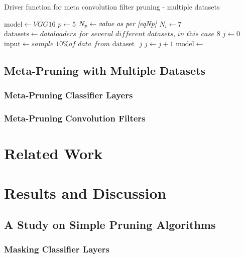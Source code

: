 \documentclass{article}
\begin{document}
\begin{algorithm}[t]
	\caption{Driver function for meta convolution filter pruning - multiple datasets} \label{FilterPruneDriverMeta}
	\begin{algorithmic}[1]	
		\State $\mathrm{model} \gets \textit{VGG16}$
		\State $p \gets 5$
		\State $N_p \gets \textit{value as per \eqref{eqNp}}$
		\State $N_i \gets 7$
		\State $\mathrm{datasets} \gets \textit{dataloaders for several different datasets, in this case $8$}$
		\State $j \gets 0$
				\State $\mathrm{input} \gets \textit{sample 10\% of data from $\mathrm{dataset}$ }j$
				\State $j \gets j + 1$
			\EndIf
			\State $\mathrm{model} \gets $ 
		\EndWhile
	\end{algorithmic}
\end{algorithm}

\subsection{Meta-Pruning with Multiple Datasets}

\subsubsection{Meta-Pruning Classifier Layers}


\subsubsection{Meta-Pruning Convolution Filters}


\section{Related Work}


\section{Results and Discussion}

\subsection{A Study on Simple Pruning Algorithms}

\subsubsection{Masking Classifier Layers}
\end{document}
